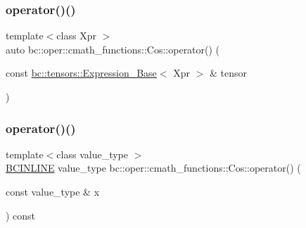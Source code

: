 \mbox{\label{structbc_1_1oper_1_1cmath__functions_1_1Cos_a1afeea7e4d021e7f74d997a9ab41d4ea}} 
\subsubsection{\texorpdfstring{operator()()}{operator()()}\hspace{0.1cm}{\footnotesize\ttfamily [2/3]}}
{\footnotesize\ttfamily template$<$class Xpr $>$ \\
auto bc\+::oper\+::cmath\+\_\+functions\+::\+Cos\+::operator() (\begin{DoxyParamCaption}\item[{const \hyperlink{classbc_1_1tensors_1_1Expression__Base}{bc\+::tensors\+::\+Expression\+\_\+\+Base}$<$ Xpr $>$ \&}]{tensor }\end{DoxyParamCaption})\hspace{0.3cm}{\ttfamily [inline]}}

\mbox{\label{structbc_1_1oper_1_1cmath__functions_1_1Cos_a2c0c9df694d1eff1f0834ed3efa98cde}} 
\subsubsection{\texorpdfstring{operator()()}{operator()()}\hspace{0.1cm}{\footnotesize\ttfamily [3/3]}}
{\footnotesize\ttfamily template$<$class value\+\_\+type $>$ \\
\hyperlink{common_8h_a6699e8b0449da5c0fafb878e59c1d4b1}{B\+C\+I\+N\+L\+I\+NE} value\+\_\+type bc\+::oper\+::cmath\+\_\+functions\+::\+Cos\+::operator() (\begin{DoxyParamCaption}\item[{const value\+\_\+type \&}]{x }\end{DoxyParamCaption}) const\hspace{0.3cm}{\ttfamily [inline]}}




